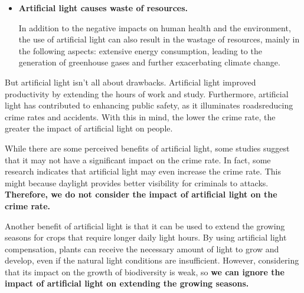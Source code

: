 \documentclass[12pt]{article}
\begin{document}
\begin{itemize}
\item\textbf{Artificial light causes waste of resources.}

In addition to the negative impacts on human health and the environment, the use of artificial light can also result in the wastage of resources, mainly in the following aspects: extensive energy consumption, leading to the generation of greenhouse gases and further exacerbating climate change.
\end{itemize}

But artificial light isn't all about drawbacks. Artificial light improved productivity by extending the hours of work and study.  Furthermore, artificial light has contributed to enhancing public safety, as it illuminates roadsreducing crime rates and accidents. With this in mind, the lower the crime rate, the greater the impact of artificial light on people. 

While there are some perceived benefits of artificial light, some studies suggest that it may not have a significant impact on the crime rate. In fact, some research indicates that artificial light may even increase the crime rate. This might because daylight provides better visibility for criminals to attacks. \textbf{Therefore, we do not consider the impact of artificial light on the crime rate.}

Another benefit of artificial light is that it can be used to extend the growing seasons for crops that require longer daily light hours. 
By using artificial light compensation, plants can receive the necessary amount of light to grow and develop, even if the natural light conditions are insufficient. 
However, considering that its impact on the growth of biodiversity is weak, %
so \textbf{we can ignore the impact of artificial light on extending the growing seasons.}
\end{document}
